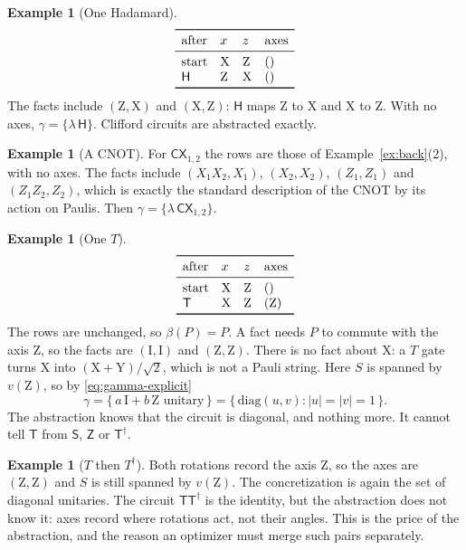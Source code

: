 \documentclass[11pt]{article}
\theoremstyle{definition}
\newtheorem{example}[theorem]{Example}
\theoremstyle{remark}
\newcommand{\adj}{^{\dagger}}
\newcommand{\gam}{\gamma}
\newcommand{\back}{\beta}
\newcommand{\tI}{\mathrm{I}}
\newcommand{\tX}{\mathrm{X}}
\newcommand{\tY}{\mathrm{Y}}
\newcommand{\tZ}{\mathrm{Z}}
\newcommand{\gate}[1]{\mathsf{#1}}
\begin{document}
\begin{example}[One Hadamard]
\[
\begin{array}{llll}
\toprule
\text{after} & x & z & \text{axes} \\
\midrule
\text{start} & \tX & \tZ & () \\
\gate H & \tZ & \tX & () \\
\bottomrule
\end{array}
\]
The facts include $(\tZ, \tX)$ and $(\tX, \tZ)$: $\gate H$ maps $\tZ$ to $\tX$ and $\tX$ to
$\tZ$. With no axes, $\gam = \{\lambda\,\gate H\}$. Clifford circuits are abstracted exactly.
\end{example}

\begin{example}[A CNOT]
For $\gate{CX}_{1,2}$ the rows are those of Example~\ref{ex:back}(2), with no axes. The
facts include $(X_1X_2, X_1)$, $(X_2, X_2)$, $(Z_1, Z_1)$ and $(Z_1Z_2, Z_2)$, which is
exactly the standard description of the CNOT by its action on Paulis. Then
$\gam = \{\lambda\, \gate{CX}_{1,2}\}$.
\end{example}

\begin{example}[One $T$]
\[
\begin{array}{llll}
\toprule
\text{after} & x & z & \text{axes} \\
\midrule
\text{start} & \tX & \tZ & () \\
\gate T & \tX & \tZ & (\tZ) \\
\bottomrule
\end{array}
\]
The rows are unchanged, so $\back(P) = P$. A fact needs $P$ to commute with the axis $\tZ$,
so the facts are $(\tI, \tI)$ and $(\tZ, \tZ)$. There is no fact about $\tX$: a $T$ gate
turns $\tX$ into $(\tX + \tY)/\sqrt2$, which is not a Pauli string. Here $S$ is spanned by
$v(\tZ)$, so by \eqref{eq:gamma-explicit}
\[
  \gam = \{\, a\,\tI + b\,\tZ \text{ unitary} \,\} = \{\, \mathrm{diag}(u, v) : |u| = |v| = 1 \,\}.
\]
The abstraction knows that the circuit is diagonal, and nothing more. It cannot tell
$\gate T$ from $\gate S$, $\gate Z$ or $\gate T\adj$.
\end{example}

\begin{example}[$T$ then $T\adj$]
Both rotations record the axis $\tZ$, so the axes are $(\tZ, \tZ)$ and $S$ is still spanned
by $v(\tZ)$. The concretization is again the set of diagonal unitaries. The circuit
$\gate T \gate T\adj$ is the identity, but the abstraction does not know it: axes record
where rotations act, not their angles. This is the price of the abstraction, and the
reason an optimizer must merge such pairs separately.
\end{example}
\end{document}
